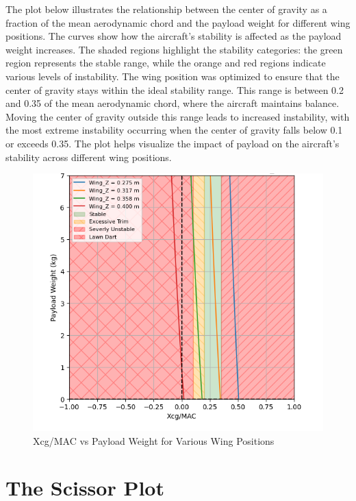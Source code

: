 \documentclass[12pt]{report}
\begin{document}
The plot below illustrates the relationship between the center of gravity as a fraction of the mean aerodynamic chord and the payload weight for different wing positions. The curves show how the aircraft's stability is affected as the payload weight increases. The shaded regions highlight the stability categories: the green region represents the stable range, while the orange and red regions indicate various levels of instability. The wing position was optimized to ensure that the center of gravity stays within the ideal stability range. This range is between 0.2 and 0.35 of the mean aerodynamic chord, where the aircraft maintains balance. Moving the center of gravity outside this range leads to increased instability, with the most extreme instability occurring when the center of gravity falls below 0.1 or exceeds 0.35. The plot helps visualize the impact of payload on the aircraft's stability across different wing positions.

	
	\begin{figure}[h!]
		\centering
		\includegraphics[width=6in]{Figures/Xcg_MAC_vs_Payload.png}
		\caption{Xcg/MAC vs Payload Weight for Various Wing Positions}
		\label{fig:Xcg_MAC}
	\end{figure}
	
\chapter{The Scissor Plot}
\end{document}

